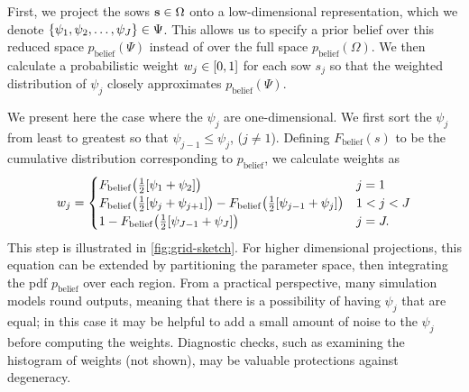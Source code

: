 \documentclass[11pt]{article}
\begin{document}
First, we project the \glspl{sow} $\vb{s} \in \Omega$ onto a low-dimensional representation, which we denote $\qty{\psi_1, \psi_2, \ldots, \psi_J} \in \Psi$.
This allows us to specify a prior belief over this reduced space $p_\mathrm{belief}(\Psi)$ instead of over the full space $p_\mathrm{belief}(\Omega)$.
We then calculate a probabilistic weight $w_j \in \qty[0, 1]$ for each \gls{sow} $s_j$ so that the weighted distribution of $\psi_j$ closely approximates $p_\mathrm{belief}(\Psi)$.

We present here the case where the $\psi_j$ are one-dimensional.
We first sort the $\psi_j$  from least to greatest so that $\psi_{j-1} \leq \psi_j$, ($j \neq 1$).
Defining $F_\mathrm{belief}(s)$ to be the cumulative distribution corresponding to $p_\mathrm{belief}$, we calculate weights as
\begin{equation}\label{eq:weights}
    w_j = \begin{cases}
        F_\mathrm{belief}\qty(\frac{1}{2}\qty[\psi_1 + \psi_2])                                                                     & j = 1     \\
        F_\mathrm{belief}\qty(\frac{1}{2}\qty[\psi_{j} + \psi_{j+1}]) - F_\mathrm{belief}\qty(\frac{1}{2}\qty[\psi_{j-1} + \psi_j]) & 1 < j < J \\
        1 - F_\mathrm{belief}\qty(\frac{1}{2}\qty[\psi_{J-1} + \psi_J])                                                             & j = J.
    \end{cases}
\end{equation}
This step is illustrated in \cref{fig:grid-sketch}.
For higher dimensional projections, this equation can be extended by partitioning the parameter space, then integrating the \gls{pdf} $p_\mathrm{belief}$ over each region.
From a practical perspective, many simulation models round outputs, meaning that there is a possibility of having $\psi_j$ that are equal; in this case it may be helpful to add a small amount of noise to the $\psi_j$ before computing the weights.
Diagnostic checks, such as examining the histogram of weights (not shown), may be valuable protections against degeneracy.
\end{document}

